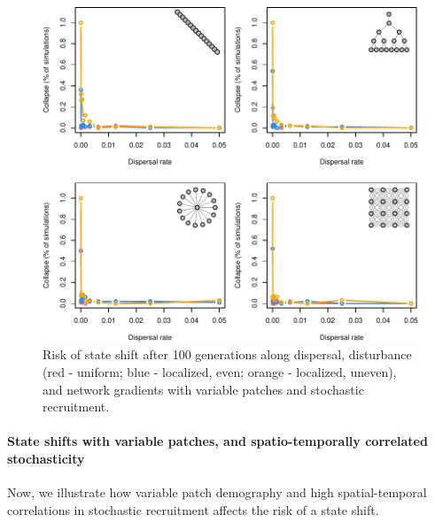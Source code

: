 \documentclass[
]{article}
\begin{document}
\begin{figure}[H]

{\centering \includegraphics{Managing_for_ecological_surprises_in_metapopulations_files/figure-latex/state shift with variable patches and stochasticity-1} 

}

\caption{Risk of state shift after 100 generations along dispersal, disturbance (red - uniform; blue - localized, even; orange - localized, uneven), and network gradients with variable patches and stochastic recruitment.}\label{fig:state shift with variable patches and stochasticity}
\end{figure}
\newpage

\hypertarget{state-shifts-with-variable-patches-and-spatio-temporally-correlated-stochasticity}{%
\paragraph{State shifts with variable patches, and spatio-temporally
correlated
stochasticity}\label{state-shifts-with-variable-patches-and-spatio-temporally-correlated-stochasticity}}

Now, we illustrate how variable patch demography and high
spatial-temporal correlations in stochastic recruitment affects the risk
of a state shift.
\end{document}
